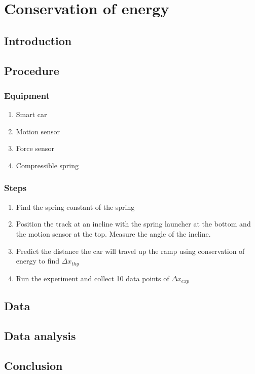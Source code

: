 \documentclass[11pt, letterpaper, includehead]{article}
\begin{document}
\section{Conservation of energy}
\subsection{Introduction}
\subsection{Procedure}
\subsubsection{Equipment}

\begin{enumerate} 
  \item Smart car
  \item Motion sensor
  \item Force sensor
  \item Compressible spring
\end{enumerate}
\subsubsection{Steps}
\begin{enumerate} 
  \item Find the spring constant of the spring 
  \item Position the track at an incline with the spring launcher at the bottom 
        and the motion sensor at the top. Measure the angle of the incline.
  \item Predict the distance the car will travel up the ramp using conservation of energy to find $\Delta x_{thy}$
  \item Run the experiment and collect 10 data points of $\Delta x_{exp}$
\end{enumerate}
\subsection{Data}
\subsection{Data analysis}
\subsection{Conclusion}
\end{document}
